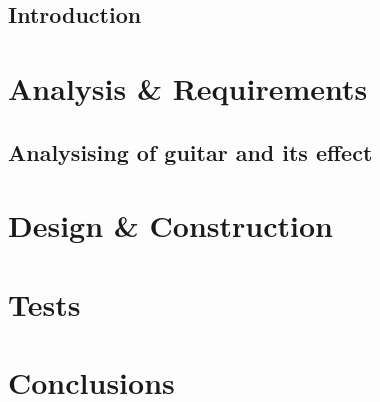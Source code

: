 \glsresetall
 \graphicspath{{figures/analysing/}}
\chapter{Introduction}

\part{Analysis \& Requirements}\label{pt:analysis} \glsresetall
 \graphicspath{{figures/analysing/}}
 \chapter{Analysising of guitar and its effect}\label{ch:analysing}
 \label{sec:electric_guitar_theory} 
 \label{sec:effects}
\label{sec:platform_comparing}

 \label{sec:FPGA}

\part{Design \& Construction}\label{pt:design} 
 
%
\part{Tests}\label{pt:tests} 
\part{Conclusions}\label{pt:conclusions} 
%

